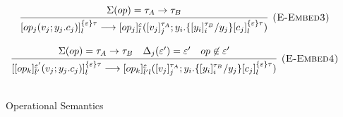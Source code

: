 \documentclass{article}
\theoremstyle{definition}
\begin{document}
\begin{figure}[H]
{\[\begin{array}{c}
\infer[\textsc{(E-Embed3)}]
{[op_j(v_j; y_j.c_j)]^{\{\varepsilon\}\tau}_l \longrightarrow [op_j]^\varepsilon_l([v_j]^{\tau_A}_j; y_i. \{[y_i]^{\tau_B}_i / y_j\}[c_j]^{\{\varepsilon\}\tau}_l)}
{ \Sigma(op) = \tau_A \rightarrow \tau_B} \\[3ex]

\infer[\textsc{(E-Embed4)}]
{[[op_k]^{\varepsilon'}_{l'}(v_j; y_j.c_j)]^{\{\varepsilon\}\tau}_l \longrightarrow [op_k]^\varepsilon_{l'l}([v_j]^{\tau_A}_j; y_i. \{[y_i]^{\tau_B}_i / y_j\}[c_j]^{\{\varepsilon\}\tau}_l)}
{ \Sigma(op) = \tau_A \rightarrow \tau_B& \Delta_j(\varepsilon') = \varepsilon' & op \not \in \varepsilon'} \\[3ex]



\end{array}
\]

}
\caption{Operational Semantics}
\end{figure}
\end{document}
